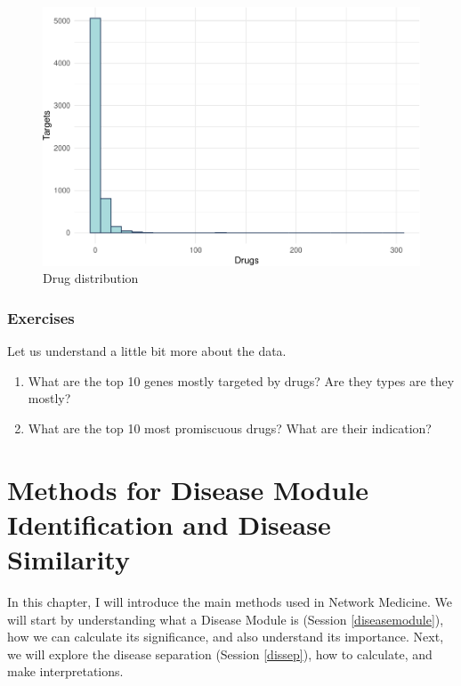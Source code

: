 \documentclass[
]{book}
\begin{document}
\begin{figure}
\centering
\includegraphics{NetMed_files/figure-latex/unnamed-chunk-19-1.pdf}
\caption{\label{fig:unnamed-chunk-19}Drug distribution}
\end{figure}

\hypertarget{exercises-2}{%
\subsection{Exercises}\label{exercises-2}}

Let us understand a little bit more about the data.

\begin{enumerate}
\def\labelenumi{\arabic{enumi}.}
\item
  What are the top 10 genes mostly targeted by drugs? Are they types are they mostly?
\item
  What are the top 10 most promiscuous drugs? What are their indication?
\end{enumerate}

\hypertarget{methods}{%
\chapter{Methods for Disease Module Identification and Disease Similarity}\label{methods}}

In this chapter, I will introduce the main methods used in Network Medicine. We will start by understanding what a Disease Module is (Session \ref{diseasemodule}), how we can calculate its significance, and also understand its importance. Next, we will explore the disease separation (Session \ref{dissep}), how to calculate, and make interpretations.
\end{document}
